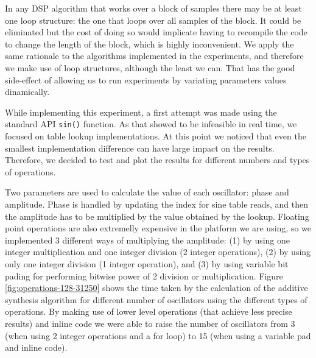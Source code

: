 

In any DSP algorithm that works over a block of samples there may be at least
one loop structure: the one that loops over all samples of the block. It could
be eliminated but the cost of doing so would implicate having to recompile the
code to change the length of the block, which is highly inconvenient. We apply
the same rationale to the algorithms implemented in the experiments, and
therefore we make use of loop structures, although the least we can. That has
the good side-effect of allowing us to run experiments by variating parameters
values dinamically.

While implementing this experiment, a first attempt was made using the
standard API \texttt{sin()} function. As that showed to be infeasible in real
time, we focused on table lookup implementations. At this point we noticed
that even the smallest implementation difference can have large impact on the
results. Therefore, we decided to test and plot the results for different
numbers and types of operations.

Two parameters are used to calculate the value of each oscillator: phase and
amplitude. Phase is handled by updating the index for sine table reads, and
then the amplitude has to be multiplied by the value obtained by the lookup.
Floating point operations are also extremelly expensive in the platform we are using, so 
we implemented 3 different ways of multiplying the amplitude: (1) by using one integer multiplication and one integer division (2 integer operations), (2) by using only one integer division (1 integer operation), and (3) by using variable bit pading for performing bitwise power of 2 division or multiplication.
Figure \ref{fig:operations-128-31250} shows the time taken by the calculation
of the additive synthesis algorithm for different number of oscillators using
the different types of operations. By making use of lower level operations
(that achieve less precise results) and inline code we were able to raise the number of
oscillators from 3 (when using 2 integer operations and a for loop) to 15 (when using a variable
pad and inline code).



